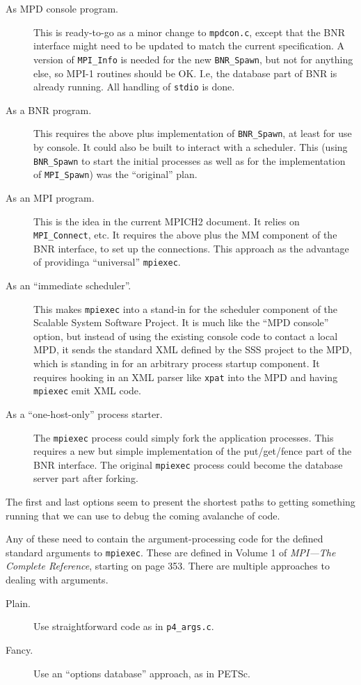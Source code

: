 \documentclass{article}
\def\code{\begingroup\makeustext\eatcode}
\def\eatcode#1{\texttt{#1}\endgroup}
\let\file=\code
\begin{document}
\begin{description}
\item[As MPD console program.] This is ready-to-go as a minor change to
  \file{mpdcon.c}, except that the BNR interface might need to be updated to
  match 
  the current specification.  A version of \code{MPI_Info} is needed for the
  new 
  \code{BNR_Spawn}, but not for anything else, so MPI-1 routines should be OK.
  I.e, 
  the database part of BNR is already running.  All handling of \code{stdio}
  is done.
\item[As a BNR program.] This requires the above plus implementation of
  \code{BNR_Spawn}, at least for use by console.  It could also be built to
  interact 
  with a scheduler.  This (using \code{BNR_Spawn} to start the initial
  processes as 
  well as for the implementation of \code{MPI_Spawn}) was the ``original''
  plan.
\item[As an MPI program.] This is the idea in the current MPICH2 document.  It
  relies on \code{MPI_Connect}, etc.  It requires the above plus the MM
  component 
  of the BNR interface, to set up the connections.  This approach as the
  advantage of providinga ``universal'' \code{mpiexec}. 
\item[As an ``immediate scheduler''.] This makes \code{mpiexec} into a stand-in
  for the scheduler component of the Scalable System Software Project.  It is
  much like the ``MPD console'' option, but instead of using the existing
  console code to contact a local MPD, it sends the standard XML defined by
  the SSS project to the MPD, which is standing in for an arbitrary process
  startup component.  It requires hooking in an XML parser like \code{xpat}
  into the MPD and having \code{mpiexec} emit XML code.
\item[As a ``one-host-only'' process starter.] The \code{mpiexec} process could
  simply fork the application processes.  This requires a new but simple
  implementation of the put/get/fence part of the BNR interface.  The original
  \code{mpiexec} process could become the database server part after forking.
\end{description}

The first and last options seem to present the shortest paths to getting
something running that we can use to debug the coming avalanche of code.

Any of these need to contain the argument-processing code for the defined
standard arguments to \code{mpiexec}.  These are defined in Volume 1 of \emph{ MPI---The Complete Reference}, starting on page 353.  There are multiple
approaches to dealing with arguments.
\begin{description}
\item[Plain.] Use straightforward code as in \file{p4_args.c}.
\item[Fancy.] Use an ``options database'' approach, as in PETSc.
\end{description}
\end{document}
